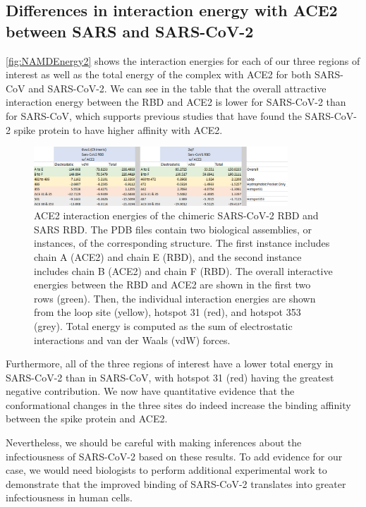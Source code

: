 \FloatBarrier
{}
\subsection{Differences in interaction energy with ACE2 between SARS and SARS-CoV-2}

\autoref{fig:NAMDEnergy2} shows the interaction energies for each of our three regions of interest as well as the total energy of the complex with ACE2 for both SARS-CoV and SARS-CoV-2. We can see in the table that the overall attractive interaction energy between the RBD and ACE2 is lower for SARS-CoV-2 than for SARS-CoV, which supports previous studies that have found the SARS-CoV-2 spike protein to have higher affinity with ACE2.\\

\begin{figure}[h]
	\centering
	\mySfFamily
	\includegraphics[width = 0.85\textwidth]{../images/NAMDEnergy2.png}
	\caption{ACE2 interaction energies of the chimeric SARS-CoV-2 RBD and SARS RBD. The PDB files contain two biological assemblies, or instances, of the corresponding structure. The first instance includes chain A (ACE2) and chain E (RBD), and the second instance includes chain B (ACE2) and chain F (RBD). The overall interactive energies between the RBD and ACE2 are shown in the first two rows (green). Then, the individual interaction energies are shown from the loop site (yellow), hotspot 31 (red), and hotspot 353 (grey). Total energy is computed as the sum of electrostatic interactions and van der Waals (vdW) forces.}
	\label{fig:NAMDEnergy2}
\end{figure}

Furthermore, all of the three regions of interest have a lower total energy in SARS-CoV-2 than in SARS-CoV, with hotspot 31 (red) having the greatest negative contribution. We now have quantitative evidence that the conformational changes in the three sites do indeed increase the binding affinity between the spike protein and ACE2.

Nevertheless, we should be careful with making inferences about the infectiousness of SARS-CoV-2 based on these results. To add evidence for our case, we would need biologists to perform additional experimental work to demonstrate that the improved binding of SARS-CoV-2 translates into greater infectiousness in human cells.

